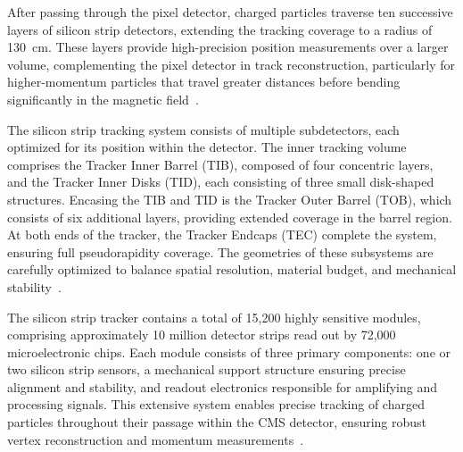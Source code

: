 After passing through the pixel detector, charged particles traverse ten successive layers of silicon strip detectors, extending the tracking coverage to a radius of 130~cm. These layers provide high-precision position measurements over a larger volume, complementing the pixel detector in track reconstruction, particularly for higher-momentum particles that travel greater distances before bending significantly in the magnetic field~\cite{Chatrchyan:1667597}. 

The silicon strip tracking system consists of multiple subdetectors, each optimized for its position within the detector. The inner tracking volume comprises the Tracker Inner Barrel (TIB), composed of four concentric layers, and the Tracker Inner Disks (TID), each consisting of three small disk-shaped structures. Encasing the TIB and TID is the Tracker Outer Barrel (TOB), which consists of six additional layers, providing extended coverage in the barrel region. At both ends of the tracker, the Tracker Endcaps (TEC) complete the system, ensuring full pseudorapidity coverage. The geometries of these subsystems are carefully optimized to balance spatial resolution, material budget, and mechanical stability~\cite{CMS:trackerTDR}. 

The silicon strip tracker contains a total of 15,200 highly sensitive modules, comprising approximately 10 million detector strips read out by 72,000 microelectronic chips. Each module consists of three primary components: one or two silicon strip sensors, a mechanical support structure ensuring precise alignment and stability, and readout electronics responsible for amplifying and processing signals. This extensive system enables precise tracking of charged particles throughout their passage within the CMS detector, ensuring robust vertex reconstruction and momentum measurements~\cite{CMS:trackingPerf}.




